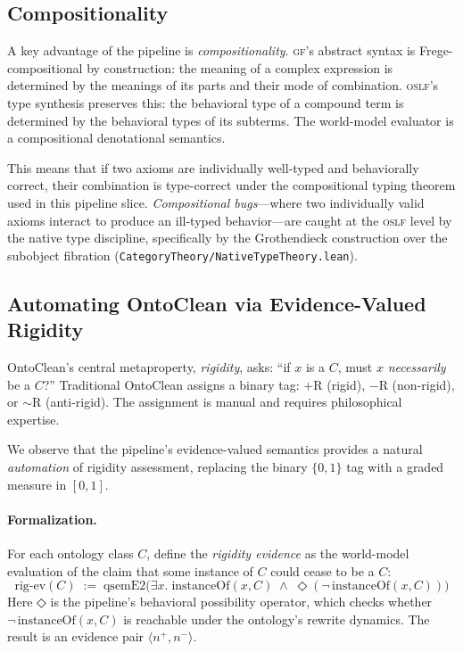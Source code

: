 \documentclass[11pt]{article}
\newcommand{\DiamondOp}{\mathbin{\Diamond}}
\newcommand{\GF}{\textsc{gf}}
\newcommand{\OSLF}{\textsc{oslf}}
\newcommand{\ev}[2]{\langle #1, #2 \rangle}
\theoremstyle{definition}
\theoremstyle{plain}
\begin{document}
\subsection{Compositionality}

A key advantage of the pipeline is \emph{compositionality}.
\GF{}'s abstract syntax is Frege-compositional by construction:
the meaning of a complex expression is determined by the meanings
of its parts and their mode of combination.
\OSLF{}'s type synthesis preserves this: the behavioral type of a
compound term is determined by the behavioral types of its subterms.
The world-model evaluator is a compositional denotational semantics.

This means that if two axioms are individually well-typed and
behaviorally correct, their combination is type-correct under the
compositional typing theorem used in this pipeline slice.
\emph{Compositional bugs}---where two individually valid axioms
interact to produce an ill-typed behavior---are caught at the \OSLF{}
level by the native type discipline, specifically by the Grothendieck
construction over the subobject fibration
(\texttt{CategoryTheory/NativeTypeTheory.lean}).

\subsection{Automating OntoClean via Evidence-Valued Rigidity}
\label{sec:evidence-rigidity}

OntoClean's central metaproperty, \emph{rigidity}, asks: ``if $x$ is
a $C$, must $x$ \emph{necessarily} be a $C$?''  Traditional OntoClean
assigns a binary tag: $+\mathrm{R}$ (rigid), $-\mathrm{R}$
(non-rigid), or ${\sim}\mathrm{R}$ (anti-rigid).  The assignment is
manual and requires philosophical expertise.

We observe that the pipeline's evidence-valued semantics provides a
natural \emph{automation} of rigidity assessment, replacing the
binary $\{0,1\}$ tag with a graded measure in $[0,1]$.

\paragraph{Formalization.}
For each ontology class $C$, define the \emph{rigidity evidence} as
the world-model evaluation of the claim that some instance of $C$
could cease to be a $C$:
\[
  \mathrm{rig\text{-}ev}(C) \;:=\;
    \mathrm{qsemE2}\bigl(\exists x.\;
      \mathrm{instanceOf}(x, C) \;\wedge\;
      \DiamondOp(\lnot\,\mathrm{instanceOf}(x, C))\bigr)
\]
Here $\DiamondOp$ is the pipeline's behavioral possibility operator,
which checks whether $\lnot\,\mathrm{instanceOf}(x, C)$ is
reachable under the ontology's rewrite dynamics.  The result is an
evidence pair $\ev{n^+}{n^-}$.
\end{document}
